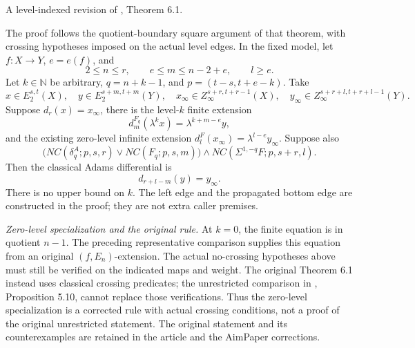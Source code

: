 \begin{theorem}
\label{sem:ProofTools:generalized-leibniz-at-level}
A level-indexed revision of \cite{LWX126}, Theorem 6.1.\par

The proof follows the quotient-boundary square argument of that theorem, with crossing hypotheses imposed on the actual level edges. In the fixed model, let $f:X\to Y$, $e=e(f)$, and
\[2\le n\le r,\qquad e\le m\le n-2+e,\qquad l\ge e.\]
Let $k\in\mathbb N$ be arbitrary, $q=n+k-1$, and $p=(t-s,t+e-k)$. Take
\[
x\in E_2^{s,t}(X),\quad y\in E_2^{s+m,t+m}(Y),\quad
x_\infty\in Z_\infty^{s+r,t+r-1}(X),\quad
y_\infty\in Z_\infty^{s+r+l,t+r+l-1}(Y).
\]
Suppose $d_r(x)=x_\infty$, there is the level-$k$ finite extension
\[d_m^{F_q}(\lambda^k x)=\lambda^{k+m-e}y,\]
and the existing zero-level infinite extension $d_l^F(x_\infty)=\lambda^{l-e}y_\infty$. Suppose also
\[
\bigl(NC(\delta_q^A;p,s,r)\lor NC(F_q;p,s,m)\bigr)
\land NC(\Sigma^{1,-q}F;p,s+r,l).
\]
Then the classical Adams differential is
\[d_{r+l-m}(y)=y_\infty.\]
There is no upper bound on $k$. The left edge and the propagated bottom edge are constructed in the proof; they are not extra caller premises.

\textit{Zero-level specialization and the original rule.}
At $k=0$, the finite equation is in quotient $n-1$. The preceding
representative comparison supplies this equation from an original
$(f,E_n)$-extension. The actual no-crossing hypotheses above must still
be verified on the indicated maps and weight. The original Theorem 6.1
instead uses classical crossing predicates; the unrestricted comparison
in \cite{LWX126}, Proposition 5.10, cannot replace those verifications.
Thus the zero-level specialization is a corrected rule with actual
crossing conditions, not a proof of the original unrestricted statement.
The original statement and its counterexamples are retained in the
article and the AimPaper corrections.
\end{theorem}
